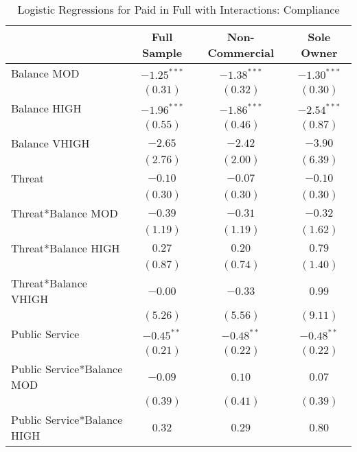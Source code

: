 \documentclass[12pt,titlepage]{article}
\begin{document}
\begin{table}[htbp]
\caption{Logistic Regressions for Paid in Full with Interactions: Compliance}
\begin{center}
\begin{tabular}{|l|c|c|c|}
\hline
                             & Full Sample & Non-Commercial & Sole Owner \\
\hline
Balance MOD                  & $-1.25^{***}$ & $-1.38^{***}$ & $-1.30^{***}$ \\
                             & $(0.31)$      & $(0.32)$      & $(0.30)$      \\
Balance HIGH                 & $-1.96^{***}$ & $-1.86^{***}$ & $-2.54^{***}$ \\
                             & $(0.55)$      & $(0.46)$      & $(0.87)$      \\
Balance VHIGH                & $-2.65$       & $-2.42$       & $-3.90$       \\
                             & $(2.76)$      & $(2.00)$      & $(6.39)$      \\
Threat                       & $-0.10$       & $-0.07$       & $-0.10$       \\
                             & $(0.30)$      & $(0.30)$      & $(0.30)$      \\
Threat*Balance MOD           & $-0.39$       & $-0.31$       & $-0.32$       \\
                             & $(1.19)$      & $(1.19)$      & $(1.62)$      \\
Threat*Balance HIGH          & $0.27$        & $0.20$        & $0.79$        \\
                             & $(0.87)$      & $(0.74)$      & $(1.40)$      \\
Threat*Balance VHIGH         & $-0.00$       & $-0.33$       & $0.99$        \\
                             & $(5.26)$      & $(5.56)$      & $(9.11)$      \\
Public Service               & $-0.45^{**}$  & $-0.48^{**}$  & $-0.48^{**}$  \\
                             & $(0.21)$      & $(0.22)$      & $(0.22)$      \\
Public Service*Balance MOD   & $-0.09$       & $0.10$        & $0.07$        \\
                             & $(0.39)$      & $(0.41)$      & $(0.39)$      \\
Public Service*Balance HIGH  & $0.32$        & $0.29$        & $0.80$        \\

\end{tabular}
\end{center}
\end{table}
\end{document}
